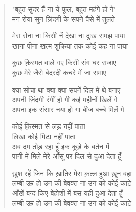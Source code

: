 \documentclass{book}
\begin{document}
\begin{verse}
{{"बहुत सुंदर हैं ना ये फूल, बहुत महंगे हों गे" \\
मन रोया सुन ज़िंदगी के सपने पैसे में तुलते 

मेरा रोना ना किसी नें देखा ना दुःख समझ पाया \\
खाना पीना ख़त्म शुक्रिया तक कोई कह ना पाया 

कुछ क़िस्मत वाले गए किसी संग घर सजाए \\
कुछ मेरे जैसे बेदरदी कचरे में जा समाए 

क्या सोचा था क्या क्या सपनें दिल में थे बनाए \\
अपनी ज़िंदगी रंगीं हो गी कई महीनों खिलें गे \\
अपना इक संसार नया हो गा बीज बच्चे मिलें गे 

कोई क़िस्मत से लड़ नहीं पाता \\
लिखा कोई मिटा नहीं पाता \\
अब दम तोड़ रहा हूँ इक कूड़े के बर्तन में \\
पानी में मिले मेरे आँसू पर दिल से दुआ देता हूँ 

ख़ुश रहें जिन कि ख़ातिर मेरा क़त्ल हुआ ख़ून बहा \\
लम्बी उम्र हो उन की बेवक्त ना उन को कोई काटे \\
आँखें बन्द किए बेहोशी में बस यही दुआ देता हूँ \\
लम्बी उम्र हो उन की बेवक्त ना उन को कोई काटे
}
}\end{verse}
\end{document}
